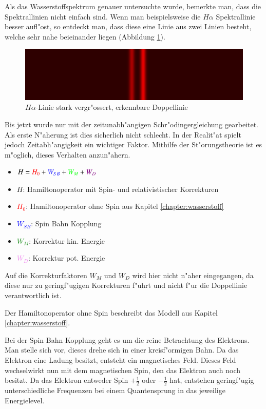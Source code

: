 \begin{refsection}
Als das Wasserstoffspektrum genauer untersuchte wurde, bemerkte man,
dass die Spektrallinien nicht einfach sind. Wenn man beispielsweise die
$H\alpha$ Spektrallinie besser aufl"ost, so entdeckt man, dass diese
eine Linie aus zwei Linien besteht, welche sehr nahe beieinander
liegen (Abbildung \ref{atomuhr:fineStructure}).

\begin{figure}
	\centering
	\includegraphics[width = .6\columnwidth]{atomuhr/fine_structure_hydrogen.png}
	\caption{$H\alpha$-Linie stark vergr"ossert, erkennbare
          Doppellinie \cite{pic:wasserstoff_feinstruktur}}
        \label{atomuhr:fineStructure}
\end{figure}

Bis jetzt wurde nur mit der zeitunabh"angigen Schr"odingergleichung gearbeitet.
Als erste N"aherung ist dies sicherlich nicht schlecht.
In der Realit"at spielt jedoch Zeitabh"angigkeit ein wichtiger Faktor. 
Mithilfe der St"orungstheorie ist es m"oglich, dieses Verhalten anzun"ahern.

\begin{itemize}
	\item[]  $H = \textcolor{red}{H_0}+ \textcolor{blue}{W_{SB}} + 
		\textcolor{green}{W_M} + \textcolor{violet}{W_D} $
	\item[]  $H$: Hamiltonoperator mit Spin- und relativistischer Korrekturen
	\item[]  \textcolor{red}{$H_0$}: Hamiltonoperator ohne Spin
          aus Kapitel \ref{chapter:wasserstoff}
	\item[]  \textcolor{blue}{$W_{SB}$}: Spin Bahn Kopplung
	\item[]  \textcolor{green}{$W_M$}: Korrektur kin. Energie
	\item[]  \textcolor{violet}{$W_D$}: Korrektur pot. Energie
	
\end{itemize}
		
Auf die Korrekturfaktoren $W_M$ und $W_D$ wird hier nicht n"aher
eingegangen, da diese nur zu geringf"ugigen Korrekturen f"uhrt und
nicht f"ur die Doppellinie verantwortlich ist.

Der Hamiltonoperator ohne Spin beschreibt das Modell aus Kapitel
\ref{chapter:wasserstoff}.

Bei der Spin Bahn Kopplung geht es um die reine Betrachtung des
Elektrons. Man stelle sich vor, dieses drehe sich in einer
kreisf"ormigen Bahn.  Da das Elektron eine Ladung besitzt, entsteht
ein magnetisches Feld.  Dieses Feld wechselwirkt nun mit dem
magnetischen Spin, den das Elektron auch noch besitzt.  Da das
Elektron entweder Spin \(+\frac{1}{2}\) oder \(-\frac{1}{2}\) hat,
entstehen geringf"ugig unterschiedliche Frequenzen bei einem
Quantensprung in das jeweilige Energielevel.


\end{refsection}
